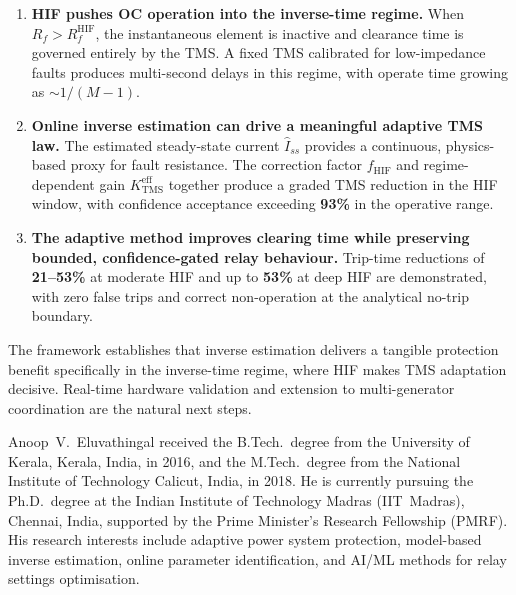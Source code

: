 \documentclass[10pt,journal,twoside]{IEEEtran}
\newcommand{\Rf}{R_{\!f}}
\newcommand{\Iss}{\hat{I}_{ss}}
\newcommand{\fhif}{f_{\mathrm{HIF}}}
\newcommand{\Keff}{K_{\mathrm{TMS}}^{\mathrm{eff}}}
\begin{document}
\begin{enumerate}
\item \textbf{HIF pushes OC operation into the inverse-time regime.}
      When $\Rf > R_f^{\mathrm{HIF}}$, the instantaneous element is inactive
      and clearance time is governed entirely by the TMS.  A fixed TMS
      calibrated for low-impedance faults produces multi-second delays
      in this regime, with operate time growing as $\sim 1/(M-1)$.

\item \textbf{Online inverse estimation can drive a meaningful adaptive TMS law.}
      The estimated steady-state current $\Iss$ provides a continuous,
      physics-based proxy for fault resistance.  The correction factor
      $\fhif$ and regime-dependent gain $\Keff$ together produce a graded
      TMS reduction in the HIF window, with confidence acceptance
      exceeding \textbf{93\%} in the operative range.

\item \textbf{The adaptive method improves clearing time while preserving
      bounded, confidence-gated relay behaviour.}
      Trip-time reductions of \textbf{21--53\%} at moderate HIF and
      up to \textbf{53\%} at deep HIF are demonstrated, with zero
      false trips and correct non-operation at the analytical no-trip
      boundary.
\end{enumerate}

The framework establishes that inverse estimation delivers a tangible
protection benefit specifically in the inverse-time regime, where HIF
makes TMS adaptation decisive.  Real-time hardware validation and
extension to multi-generator coordination are the natural next steps.

\begin{IEEEbiographynophoto}{Anoop~V.~Eluvathingal}
  received the B.Tech.\ degree from the University of Kerala, Kerala, India,
  in 2016, and the M.Tech.\ degree from the National Institute of Technology
  Calicut, India, in 2018.  He is currently pursuing the Ph.D.\ degree at
  the Indian Institute of Technology Madras (IIT~Madras), Chennai, India,
  supported by the Prime Minister's Research Fellowship (PMRF).  His research
  interests include adaptive power system protection, model-based inverse
  estimation, online parameter identification, and AI/ML methods for relay
  settings optimisation.
\end{IEEEbiographynophoto}
\end{document}
